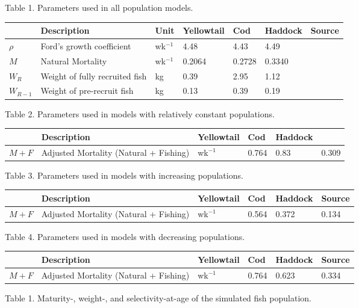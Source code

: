 \documentclass[
  12pt,
]{article}
\begin{document}
\pagebreak

Table 1. Parameters used in all population models.

\begin{longtable}[]{@{}lllllll@{}}
\toprule
& Description & Unit & Yellowtail & Cod & Haddock & Source \\
\midrule
\endhead
\(\rho\) & Ford's growth coefficient & wk\(^{-1}\) & 4.48 & 4.43 & 4.49 & \\
\(M\) & Natural Mortality & wk\(^{-1}\) & 0.2064 & 0.2728 & 0.3340 & \\
\(W_R\) & Weight of fully recruited fish & kg & 0.39 & 2.95 & 1.12 & \\
\(W_{R-1}\) & Weight of pre-recruit fish & kg & 0.13 & 0.39 & 0.19 & \\
\bottomrule
\end{longtable}

Table 2. Parameters used in models with relatively constant populations.

\begin{longtable}[]{@{}llllll@{}}
\toprule
& Description & Yellowtail & Cod & Haddock & \\
\midrule
\endhead
\(M+F\) & Adjusted Mortality (Natural + Fishing) & wk\(^{-1}\) & 0.764 & 0.83 & 0.309 \\
\bottomrule
\end{longtable}

Table 3. Parameters used in models with increasing populations.

\begin{longtable}[]{@{}llllll@{}}
\toprule
& Description & Yellowtail & Cod & Haddock & Source \\
\midrule
\endhead
\(M+F\) & Adjusted Mortality (Natural + Fishing) & wk\(^{-1}\) & 0.564 & 0.372 & 0.134 \\
\bottomrule
\end{longtable}

Table 4. Parameters used in models with decreasing populations.

\begin{longtable}[]{@{}llllll@{}}
\toprule
& Description & Yellowtail & Cod & Haddock & Source \\
\midrule
\endhead
\(M+F\) & Adjusted Mortality (Natural + Fishing) & wk\(^{-1}\) & 0.764 & 0.623 & 0.334 \\
\bottomrule
\end{longtable}

Table 1. Maturity-, weight-, and selectivity-at-age of the simulated fish population.
\end{document}
